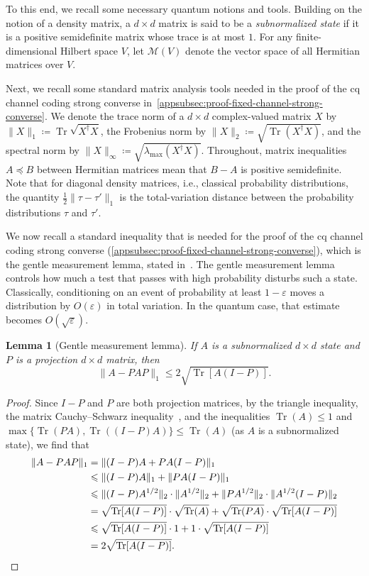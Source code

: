 \documentclass[11pt]{article}
\renewcommand{\leq}{\leqslant}
\newtheorem{lemma}[lemma]{Lemma}
\theoremstyle{remark}
\newcommand{\cM}{\mathcal{M}}
\newcommand{\Tr}{\operatorname{Tr}}
\newcommand{\eps}{\varepsilon}
\newcommand{\norm}[1]{\lVert#1\rVert}
\begin{document}
To this end, we recall some necessary quantum notions and tools. Building on the notion of a density matrix, a $d \times d$ matrix is said to be a \emph{subnormalized state} if it is a positive semidefinite matrix whose trace is at most $1$. For any finite-dimensional Hilbert space $V$, let $\cM(V)$ denote the vector space of all Hermitian matrices over $V$.

Next, we recall some standard matrix analysis tools needed in the proof of the cq channel coding strong converse in~\cref{appsubsec:proof-fixed-channel-strong-converse}. We denote the trace norm of a $d \times d$ complex-valued matrix $X$ by $\norm{X}_1 \coloneqq \Tr\sqrt{X^\dagger X}$, the Frobenius norm by $\norm{X}_2 \coloneqq \sqrt{\Tr(X^\dagger X)}$, and the spectral norm by $\norm{X}_\infty \coloneqq \sqrt{\lambda_{\max}(X^\dagger X)}$. Throughout, matrix inequalities $A \preceq B$ between Hermitian matrices mean that $B-A$ is positive semidefinite. Note that for diagonal density matrices, i.e., classical probability distributions, the quantity $\frac{1}{2}\norm{\tau-\tau'}_1$ is the total-variation distance between the probability distributions $\tau$ and $\tau'$.

We now recall a standard inequality that is needed for the proof of the cq channel coding strong converse (\cref{appsubsec:proof-fixed-channel-strong-converse}), which is the gentle measurement lemma, stated in~\cite[Lemma~9.4.2 and Exercise~9.4.1]{Wil21}. The gentle measurement lemma controls how much a test that passes with high probability disturbs such a state. Classically, conditioning on an event of probability at least $1-\eps$ moves a distribution by $O(\eps)$ in total variation. In the quantum case, that estimate becomes $O(\sqrt{\eps})$.

\begin{lemma}[Gentle measurement lemma]
\label{lem:gentle-measurement}
If $A$ is a subnormalized $d \times d$ state and $P$ is a projection $d \times d$ matrix, then
\begin{equation*}
\norm{A-PAP}_1
\leq 2\sqrt{\Tr[A(I-P)]}.
\end{equation*}
\end{lemma}
\begin{proof}
Since $I-P$ and $P$ are both projection matrices, by the triangle inequality, the matrix Cauchy--Schwarz inequality~\cite[Corollary IV.2.6]{Bha97}, and the inequalities $\Tr(A) \leq 1$ and $\max\{\Tr(PA),\Tr((I-P)A)\} \leq \Tr(A)$ (as $A$ is a subnormalized state), we find that
\begin{align*}
\norm{A-PAP}_1 &= \norm{(I-P)A+PA(I-P)}_1\\
&\leq \norm{(I-P)A}_1 +\norm{PA(I-P)}_1 \\
&\leq \norm{(I-P)A^{1/2}}_2 \cdot \norm{A^{1/2}}_2 + \norm{PA^{1/2}}_2 \cdot \norm{A^{1/2}(I-P)}_2\\
&= \sqrt{\Tr[A(I-P)]} \cdot \sqrt{\Tr(A)} + \sqrt{\Tr(PA)} \cdot \sqrt{\Tr[A(I-P)]} \\
&\leq \sqrt{\Tr[A(I-P)]} \cdot 1 + 1 \cdot \sqrt{\Tr[A(I-P)]} \\
&= 2\sqrt{\Tr[A(I-P)]}. \qedhere
\end{align*}
\end{proof}
\end{document}
